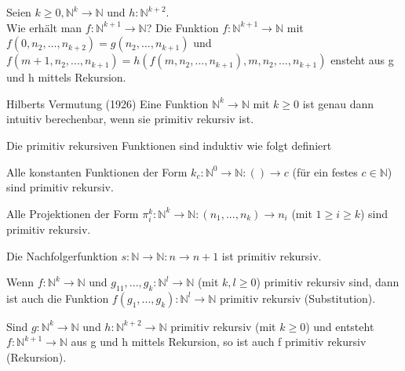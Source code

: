 \documentclass[avery5371, frame]{flashcards}
\begin{document}
\begin{flashcard}[Definition]{Seien $k\geq 0, \mathbb{N}^k\rightarrow \mathbb{N}$ und $h:\mathbb{N}^{k+2}$.\\ Wie erhält man $f:\mathbb{N}^{k+1}\rightarrow\mathbb{N}$?}
    Die Funktion $f:\mathbb{N}^{k+1}\rightarrow\mathbb{N}$ mit $f(0,n_2,...,n_{k+2})=g(n_2,...,n_{k+1})$ und $f(m+1, n_2,...,n_{k+1})=h(f(m,n_2,...,n_{k+1}),m,n_2,...,n_{k+1})$ ensteht aus g und h mittels Rekursion.
\end{flashcard}

\begin{flashcard}[Definition]{Hilberts Vermutung (1926)}
    Eine Funktion $\mathbb{N}^k\rightarrow\mathbb{N}$ mit $k\geq 0$ ist genau dann intuitiv berechenbar, wenn sie primitiv rekursiv ist.
\end{flashcard}

\begin{flashcard}[Definition]{ Die primitiv rekursiven Funktionen sind induktiv wie folgt definiert}
    \scriptsize
    \begin{itemize*}
        \item Alle konstanten Funktionen der Form $k_c:\mathbb{N}^0\rightarrow\mathbb{N}:()\rightarrow c$ (für ein festes $c\in\mathbb{N}$) sind primitiv rekursiv.
        \item Alle Projektionen der Form $\pi_i^k:\mathbb{N}^k\rightarrow\mathbb{N}: (n_1,..., n_k)\rightarrow n_i$ (mit $1\geq i\geq k$) sind primitiv rekursiv.
        \item Die Nachfolgerfunktion $s:\mathbb{N}\rightarrow\mathbb{N}: n\rightarrow n + 1$ ist primitiv rekursiv.
        \item Wenn $f:\mathbb{N}^k\rightarrow\mathbb{N}$ und $g_11,...,g_k:\mathbb{N}^l\rightarrow\mathbb{N}$ (mit $k,l\geq 0$) primitiv rekursiv sind, dann ist auch die Funktion $f(g_1,..., g_k):\mathbb{N}^l\rightarrow\mathbb{N}$ primitiv rekursiv (Substitution).
        \item Sind $g:\mathbb{N}^k\rightarrow\mathbb{N}$ und $h:\mathbb{N}^{k+2}\rightarrow\mathbb{N}$ primitiv rekursiv (mit $k\geq 0$) und entsteht $f:\mathbb{N}^{k+1}\rightarrow\mathbb{N}$ aus g und h mittels Rekursion, so ist auch f primitiv rekursiv (Rekursion).
    \end{itemize*}
\end{flashcard}
\end{document}
